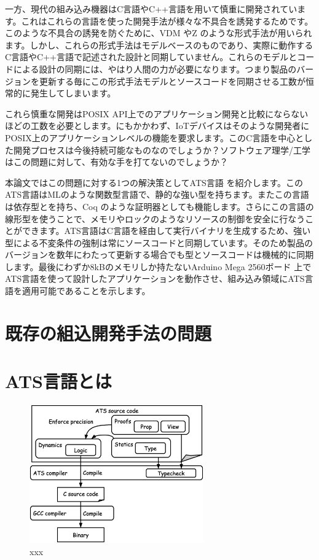 \documentclass{ipsjprosym}
\begin{document}
一方、現代の組み込み機器はC言語やC++言語を用いて慎重に開発されています。これはこれらの言語を使った開発手法が様々な不具合を誘発するためです。このような不具合の誘発を防ぐために、VDM \cite{vdm} やZ \cite{z_notation} のような形式手法が用いられます。しかし、これらの形式手法はモデルベースのものであり、実際に動作するC言語やC++言語で記述された設計と同期していません。これらのモデルとコードによる設計の同期には、やはり人間の力が必要になります。つまり製品のバージョンを更新する毎にこの形式手法モデルとソースコードを同期させる工数が恒常的に発生してしまいます。

これら慎重な開発はPOSIX API上でのアプリケーション開発と比較にならないほどの工数を必要とします。にもかかわず、IoTデバイスはそのような開発者にPOSIX上のアプリケーションレベルの機能を要求します。このC言語を中心とした開発プロセスは今後持続可能なものなのでしょうか？ソフトウェア理学/工学はこの問題に対して、有効な手を打てないのでしょうか？

本論文ではこの問題に対する1つの解決策としてATS言語 \cite{ats} を紹介します。このATS言語はMLのような関数型言語で、静的な強い型を持ちます。またこの言語は依存型とを持ち、Coq \cite{Coq_manual} のような証明器としても機能します。さらにこの言語の線形型を使うことで、メモリやロックのようなリソースの制御を安全に行なうことができます。ATS言語はC言語を経由して実行バイナリを生成するため、強い型による不変条件の強制は常にソースコードと同期しています。そのため製品のバージョンを数年にわたって更新する場合でも型とソースコードは機械的に同期します。最後にわずか8kBのメモリしか持たないArduino Mega 2560ボード \cite{arduino-mega} 上でATS言語を使って設計したアプリケーションを動作させ、組み込み領域にATS言語を適用可能であることを示します。

\section{既存の組込開発手法の問題}
\section{ATS言語とは}

\begin{figure}[h]
\centering
\includegraphics[width=75mm]{draw/flow.eps}
\caption{xxx}
\label{fig:flow}
\end{figure}
\end{document}
